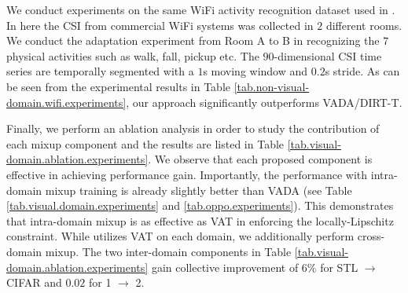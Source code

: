 We conduct experiments on the same WiFi activity recognition dataset \cite{yousefi2017survey} used in \cite{shu2018dirt}. In here the CSI from commercial WiFi systems was collected in $2$ different rooms. We conduct the adaptation experiment from Room A to B in recognizing the $7$ physical activities such as walk, fall, pickup etc. The $90$-dimensional CSI time series are temporally segmented with a $1$s moving window and $0.2$s stride. As can be seen from the experimental results in Table \ref{tab.non-visual-domain.wifi.experiments}, our approach significantly outperforms VADA/DIRT-T.


Finally, we perform an ablation analysis in order to study the contribution of each mixup component and the results are listed in Table \ref{tab.visual-domain.ablation.experiments}. We observe that each proposed component is effective in achieving performance gain. Importantly, the performance with intra-domain mixup training is already slightly better than VADA (see Table \ref{tab.visual.domain.experiments} and \ref{tab.oppo.experiments}). This demonstrates that intra-domain mixup is as effective as VAT \cite{shu2018dirt} in enforcing the locally-Lipschitz constraint. While \cite{shu2018dirt} utilizes VAT on each domain, we additionally perform cross-domain mixup. The two inter-domain components in Table \ref{tab.visual-domain.ablation.experiments} gain collective improvement of $6\%$ for STL $\rightarrow$ CIFAR and $0.02$ for 1 $\rightarrow$ 2.





















